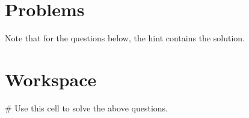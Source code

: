 \documentclass{ximera}
\begin{document}
\section{Problems}

Note that for the questions below, the hint contains the solution.

\begin{question}
\end{question}

\section{Workspace}

\begin{sageCell}
# Use this cell to solve the above questions.
\end{sageCell}
\end{document}
